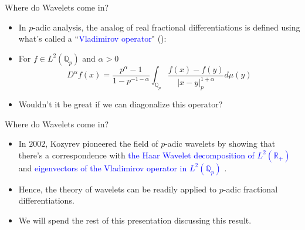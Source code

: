 \documentclass[hyperref, notheorems]{beamer}
\DeclareMathOperator{\diam}{\mathrm{diam}}
\newcommand{\Rbb}{\mathbb{R}}
\newcommand{\Qbb}{\mathbb{Q}}
\newcommand{\Cbb}{\mathbb{C}}
\newcommand{\txtblue}{\textcolor{blue}}
\theoremstyle{definition}
\begin{document}
\begin{frame}{Where do Wavelets come in?}

\begin{itemize}
    
    \item In $p$-adic analysis, the analog of real fractional differentiations is defined using what's called a ``\txtblue{Vladimirov operator}" (\cite{vladimirov_1988}):
    \item For $f \in L^2(\Qbb_p)$ and $\alpha > 0$
        \[D^\alpha f(x) = \frac{p^\alpha - 1}{1 - p^{-1 - \alpha}} \int_{\Qbb_p} \frac{f(x) - f(y)}{|x - y|^{1+\alpha}_p} d\mu(y)\]
    \item Wouldn't it be great if we can diagonalize this operator?
\end{itemize}
\end{frame}

\begin{frame}{Where do Wavelets come in?}
\begin{itemize}
    \item In $2002$, Kozyrev pioneered the field of $p$-adic wavelets by showing that there's a correspondence with \txtblue{the Haar Wavelet decomposition of $L^2(\Rbb_+)$} and \txtblue{eigenvectors of the Vladimirov operator in $L^2(\Qbb_p)$} \cite{kozyrev_2002}.
    \item Hence, the theory of wavelets can be readily applied to $p$-adic fractional differentiations.
    \item We will spend the rest of this presentation discussing this result.
\end{itemize}
\end{frame}



\end{document}
